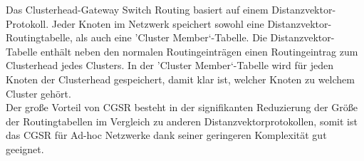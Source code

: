 Das Clusterhead-Gateway Switch Routing basiert auf einem Distanzvektor-Protokoll. Jeder Knoten im Netzwerk speichert sowohl eine Distanzvektor-Routingtabelle, als auch eine 'Cluster Member‘-Tabelle. Die Distanzvektor-Tabelle enthält neben den normalen Routingeinträgen einen Routingeintrag zum Clusterhead jedes Clusters. In der 'Cluster Member‘-Tabelle wird für jeden Knoten der Clusterhead gespeichert, damit klar ist, welcher Knoten zu welchem Cluster gehört. \\

Der große Vorteil von CGSR besteht in der signifikanten Reduzierung der Größe der Routingtabellen im Vergleich zu anderen Distanzvektorprotokollen, somit ist das CGSR für Ad-hoc Netzwerke dank seiner geringeren Komplexität gut geeignet.

